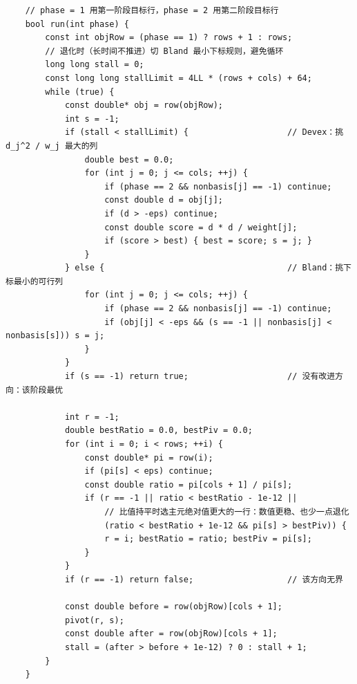 \begin{verbatim}
    // phase = 1 用第一阶段目标行，phase = 2 用第二阶段目标行
    bool run(int phase) {
        const int objRow = (phase == 1) ? rows + 1 : rows;
        // 退化时（长时间不推进）切 Bland 最小下标规则，避免循环
        long long stall = 0;
        const long long stallLimit = 4LL * (rows + cols) + 64;
        while (true) {
            const double* obj = row(objRow);
            int s = -1;
            if (stall < stallLimit) {                    // Devex：挑 d_j^2 / w_j 最大的列
                double best = 0.0;
                for (int j = 0; j <= cols; ++j) {
                    if (phase == 2 && nonbasis[j] == -1) continue;
                    const double d = obj[j];
                    if (d > -eps) continue;
                    const double score = d * d / weight[j];
                    if (score > best) { best = score; s = j; }
                }
            } else {                                     // Bland：挑下标最小的可行列
                for (int j = 0; j <= cols; ++j) {
                    if (phase == 2 && nonbasis[j] == -1) continue;
                    if (obj[j] < -eps && (s == -1 || nonbasis[j] < nonbasis[s])) s = j;
                }
            }
            if (s == -1) return true;                    // 没有改进方向：该阶段最优

            int r = -1;
            double bestRatio = 0.0, bestPiv = 0.0;
            for (int i = 0; i < rows; ++i) {
                const double* pi = row(i);
                if (pi[s] < eps) continue;
                const double ratio = pi[cols + 1] / pi[s];
                if (r == -1 || ratio < bestRatio - 1e-12 ||
                    // 比值持平时选主元绝对值更大的一行：数值更稳、也少一点退化
                    (ratio < bestRatio + 1e-12 && pi[s] > bestPiv)) {
                    r = i; bestRatio = ratio; bestPiv = pi[s];
                }
            }
            if (r == -1) return false;                   // 该方向无界

            const double before = row(objRow)[cols + 1];
            pivot(r, s);
            const double after = row(objRow)[cols + 1];
            stall = (after > before + 1e-12) ? 0 : stall + 1;
        }
    }


\end{verbatim}
